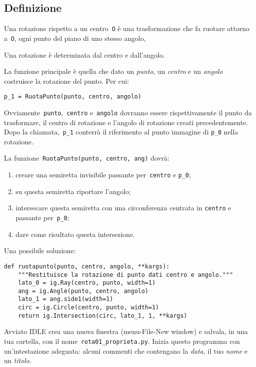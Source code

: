 \subsection{Definizione}

Una rotazione rispetto a un centro~\lstinline{O} è una trasformazione che fa
ruotare attorno a~\lstinline{O}, ogni punto del piano di uno stesso angolo,

Una rotazione è determinata dal centro e dall'angolo.

La funzione principale è quella che dato un \emph{punto}, un \emph{centro}
e un \emph{angolo} costruisce la rotazione del punto. Per cui:

\begin{lstlisting}
p_1 = RuotaPunto(punto, centro, angolo)
\end{lstlisting}

Ovviamente~\lstinline{punto},~\lstinline{centro} e~\lstinline{angolo} dovranno 
essere rispettivamente il punto da trasformare, il centro di rotazione
e l'angolo di rotazione creati precedentemente.
Dopo la chiamata,~\lstinline{p_1} conterrà il riferimento al punto immagine di
\lstinline{p_0} nella rotazione.

La funzione~\lstinline{RuotaPunto(punto, centro, ang)} dovrà:

\begin{enumerate} [noitemsep]
\item creare una semiretta invisibile passante per~\lstinline{centro} e 
\lstinline{p_0};
\item su questa semiretta riportare l'angolo;
\item intersecare questa semiretta con una circonferenza centrata in 
\lstinline{centro}
e passante per~\lstinline{p_0};
\item dare come risultato questa intersezione.

\end{enumerate}

Una possibile soluzione:

\begin{lstlisting}
def ruotapunto(punto, centro, angolo, **kargs):
    """Restituisce la rotazione di punto dati centro e angolo."""
    lato_0 = ig.Ray(centro, punto, width=1)
    ang = ig.Angle(punto, centro, angolo)
    lato_1 = ang.side1(width=1)
    circ = ig.Circle(centro, punto, width=1)
    return ig.Intersection(circ, lato_1, 1, **kargs)
\end{lstlisting}

Avviato IDLE crea una nuova finestra (menu-File-New window) e salvala,
in una tua cartella, con il nome~\lstinline{rota01_proprieta.py}.
Inizia questo programma con un'intestazione adeguata: alcuni commenti che 
contengano la \emph{data}, il tuo \emph{nome} e un \emph{titolo}.

